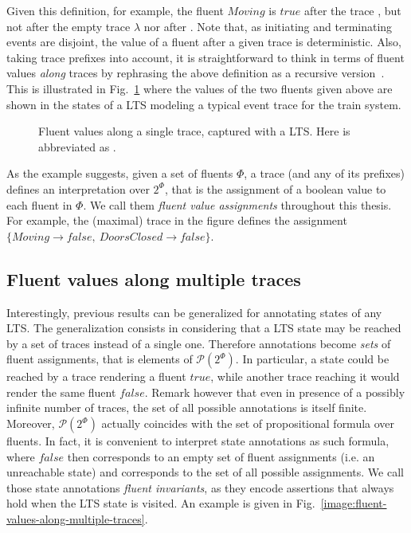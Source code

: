 Given this definition, for example, the fluent $Moving$ is $true$ after the trace , but not after the empty trace $\lambda$ nor after . Note that, as initiating and terminating events are disjoint, the value of a fluent after a given trace is deterministic. Also, taking trace prefixes into account, it is straightforward to think in terms of fluent values \emph{along} traces by rephrasing the above definition as a recursive version~\cite{Damas:2005}. This is illustrated in Fig.~\ref{image:fluent-values-along-a-trace} where the values of the two fluents given above are shown in the states of a LTS modeling a typical event trace for the train system. 

\begin{figure}[H]\centering
{}
\caption{Fluent values along a single trace, captured with a LTS. Here  is abbreviated as .\label{image:fluent-values-along-a-trace}}
\end{figure}

As the example suggests, given a set of fluents $\Phi$, a trace (and any of its prefixes) defines an interpretation over $2^\Phi$, that is the assignment of a boolean value to each fluent in $\Phi$. We call them \emph{fluent value assignments} throughout this thesis. For example, the (maximal) trace in the figure defines the assignment $\{Moving \rightarrow false,~DoorsClosed \rightarrow false\}$. 

\subsection{Fluent values along multiple traces}

Interestingly, previous results can be generalized for annotating states of any LTS. The generalization consists in considering that a LTS state may be reached by a set of traces instead of a single one. Therefore annotations become \emph{sets} of fluent assignments, that is elements of $\mathcal{P}(2^\Phi)$. In particular, a state could be reached by a trace rendering a fluent $true$, while another trace reaching it would render the same fluent $false$. Remark however that even in presence of a possibly infinite number of traces, the set of all possible annotations is itself finite. Moreover, $\mathcal{P}(2^\Phi)$ actually coincides with the set of propositional formula over fluents. In fact, it is convenient to interpret state annotations as such formula, where $false$ then corresponds to an empty set of fluent assignments (i.e. an unreachable state) and  corresponds to the set of all possible assignments. We call those state annotations \emph{fluent invariants}, as they encode assertions that always hold when the LTS state is visited. An example is given in Fig.~\ref{image:fluent-values-along-multiple-traces}.

